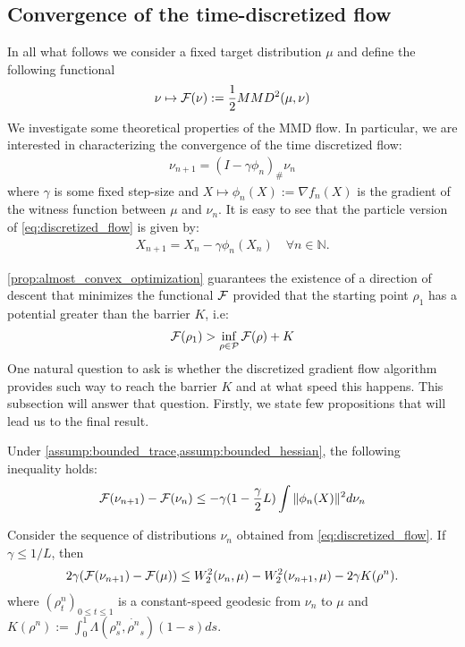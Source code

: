 

\subsection{Convergence of the time-discretized flow}


In all what follows we consider a fixed target distribution $\mu$ and define the following functional 
\begin{align}\label{eq:MMD_functional}
\nu \mapsto {{\mathcal F}}(\nu):=\frac{1}{2} MMD^2(\mu,\nu)\textbf{}
\end{align}
We investigate some theoretical properties of the MMD flow. In particular, we are interested in characterizing the convergence of the time discretized flow:
\begin{align}\label{eq:discretized_flow}
\nu_{n+1} = (I -\gamma \phi_n)_{\#}\nu_n
\end{align}
where $\gamma$ is some fixed step-size and $X \mapsto \phi_n(X):=\nabla f_{n}(X)$ is the gradient of the witness function between $\mu$ and $\nu_n$. It is easy to see that the particle version of \cref{eq:discretized_flow} is given by:
\begin{align}
X_{n+1} = X_n - \gamma \phi_n(X_n) \quad\forall n\in \mathbb{N}.
\end{align} 

\cref{prop:almost_convex_optimization} guarantees the existence of a direction of descent that minimizes the functional ${{\mathcal F}}$ provided that the starting point $\rho_1$ has a potential greater than the barrier $K$, i.e:
\begin{align}\label{eq:barrier_condition}
	{{\mathcal F}}(\rho_1)> \inf_{\rho\in \mathcal{P}} {{\mathcal F}}(\rho) + K
\end{align}
One natural question to ask is whether the  discretized gradient flow algorithm provides such way to reach the barrier $K$ and at what speed this happens. This subsection will answer that question. Firstly, we state few propositions that will lead us to the final result.


\begin{proposition}\label{prop:decreasing_functional}
	Under \cref{assump:bounded_trace,assump:bounded_hessian}, the following inequality holds:
	\begin{align*}
	{{\mathcal F}}(\nu_{n+1})-{{\mathcal F}}(\nu_n)\leq -\gamma (1-\frac{\gamma}{2}L )\int \Vert \phi_n(X)\Vert^2 d\nu_n
	\end{align*}
\end{proposition}

\begin{proposition}\label{prop:evi}
	Consider the sequence of distributions $\nu_n$ obtained from \cref{eq:discretized_flow}. If $\gamma \leq 1/L$, then
	\begin{align}
2\gamma({{\mathcal F}}(\nu_{n+1})-{{\mathcal F}}(\mu))
\leq 
W_2^2(\nu_n,\mu)-W_2^2(\nu_{n+1},\mu)-2\gamma K(\rho^n).
\label{eq:evi}
\end{align}
where $(\rho^n_t)_{0\leq t \leq 1}$ is a constant-speed geodesic from $\nu_n$ to $\mu$ and $K(\rho^n):=\int_0^1 \Lambda(\rho^n_s,\dot{\rho^n}_s)(1-s)ds$.
\end{proposition}

